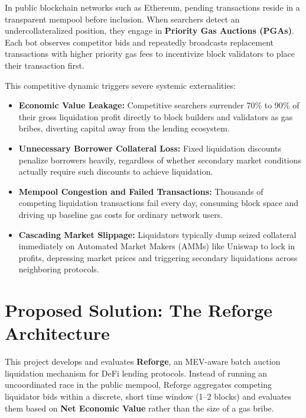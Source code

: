 In public blockchain networks such as Ethereum, pending transactions reside in a transparent mempool before inclusion. When searchers detect an undercollateralized position, they engage in \textbf{Priority Gas Auctions (PGAs)}. Each bot observes competitor bids and repeatedly broadcasts replacement transactions with higher priority gas fees to incentivize block validators to place their transaction first.

This competitive dynamic triggers severe systemic externalities:
\begin{itemize}
    \item \textbf{Economic Value Leakage:} Competitive searchers surrender 70\% to 90\% of their gross liquidation profit directly to block builders and validators as gas bribes, diverting capital away from the lending ecosystem.
    \item \textbf{Unnecessary Borrower Collateral Loss:} Fixed liquidation discounts penalize borrowers heavily, regardless of whether secondary market conditions actually require such discounts to achieve liquidation.
    \item \textbf{Mempool Congestion and Failed Transactions:} Thousands of competing liquidation transactions fail every day, consuming block space and driving up baseline gas costs for ordinary network users.
    \item \textbf{Cascading Market Slippage:} Liquidators typically dump seized collateral immediately on Automated Market Makers (AMMs) like Uniswap to lock in profits, depressing market prices and triggering secondary liquidations across neighboring protocols.
\end{itemize}

\section{Proposed Solution: The Reforge Architecture}
This project develops and evaluates \textbf{Reforge}, an MEV-aware batch auction liquidation mechanism for DeFi lending protocols. Instead of running an uncoordinated race in the public mempool, Reforge aggregates competing liquidator bids within a discrete, short time window (1--2 blocks) and evaluates them based on \textbf{Net Economic Value} rather than the size of a gas bribe.

